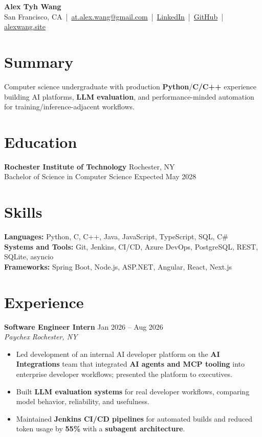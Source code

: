 \documentclass[10pt,letterpaper]{article}
\newcommand{\resumeRole}[4]{%
  \textbf{#1} \hfill #2\\
  \textit{#3} \hfill \textit{#4}
}
\newcommand{\majorGap}{\vspace{1pt plus 2fill}}
\begin{document}
\begin{center}
{\Large \textbf{Alex Tyh Wang}}\\
San Francisco, CA \,|\, \href{mailto:at.alex.wang@gmail.com}{at.alex.wang@gmail.com} \,|\, \href{https://www.linkedin.com/in/alex-tyh-wang/}{LinkedIn} \,|\, \href{https://github.com/alextyhwang}{GitHub} \,|\, \href{https://alexwang.site}{alexwang.site}
\end{center}

\section*{Summary}
Computer science undergraduate with production \textbf{Python}/\textbf{C/C++} experience building AI platforms, \textbf{LLM evaluation}, and performance-minded automation for training/inference-adjacent workflows.

\majorGap
\section*{Education}
\textbf{Rochester Institute of Technology} \hfill Rochester, NY\\
Bachelor of Science in Computer Science \hfill Expected May 2028

\majorGap
\section*{Skills}
\textbf{Languages:} Python, C, C++, Java, JavaScript, TypeScript, SQL, C\#\\
\textbf{Systems and Tools:} Git, Jenkins, CI/CD, Azure DevOps, PostgreSQL, REST, SQLite, asyncio\\
\textbf{Frameworks:} Spring Boot, Node.js, ASP.NET, Angular, React, Next.js

\majorGap
\section*{Experience}
\resumeRole{Software Engineer Intern}{Jan 2026 -- Aug 2026}{Paychex}{Rochester, NY}
\begin{itemize}
  \item Led development of an internal AI developer platform on the \textbf{AI Integrations} team that integrated \textbf{AI agents and MCP tooling} into enterprise developer workflows; presented the platform to executives.
  \item Built \textbf{LLM evaluation systems} for real developer workflows, comparing model behavior, reliability, and usefulness.
  \item Maintained \textbf{Jenkins CI/CD pipelines} for automated builds and reduced token usage by \textbf{55\%} with a \textbf{subagent architecture}.
\end{itemize}
\end{document}
